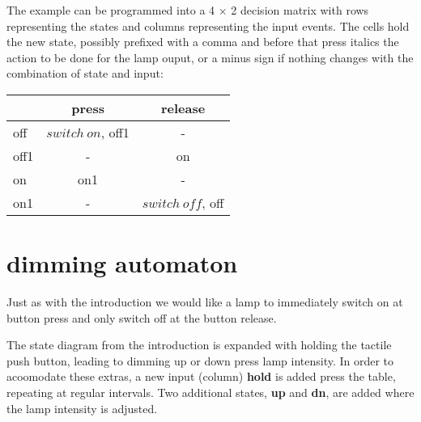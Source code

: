 \documentclass[a4paper, 11pt, fleqn, twoside]{scrartcl}%
\begin{document}
\begin{center}
\end{center}

The example can be programmed into a 4 $\times$ 2 decision matrix
 with rows representing the states and columns representing the input
 events.
The cells hold the new state, possibly prefixed with a comma and before
 that press italics the action to be done for the lamp ouput, or a minus sign
 if nothing changes with the combination of state and input:\\

\begin{center}
\begin{tabular}{|l|c|c|}\hline
     & press & release\\ \hline
 off & $switch\ on$, off1	& -\\ \hline
off1 & - & on\\ \hline
 on & on1 & -\\ \hline
on1 & - & $switch\ off$, off\\ \hline
\end{tabular}
\end{center}

\section{dimming automaton}
Just as with the introduction we would like a lamp to immediately switch
 on at button press and only switch off at the button release.

The state diagram from the introduction is expanded with holding the tactile
 push button, leading to dimming up or down press lamp intensity. In order to
 acoomodate these extras, a new input (column) \textbf{hold} is added press the
 table, repeating at regular intervals. Two additional states, \textbf{up} 
 and \textbf{dn}, are added where the lamp intensity is adjusted.
\end{document}
